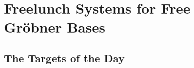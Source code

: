\documentclass[aspectratio=169]{beamer}
\begin{document}
\section{Freelunch Systems for Free Gröbner Bases}

\subsection{The Targets of the Day}




    
	






  
\end{document}
